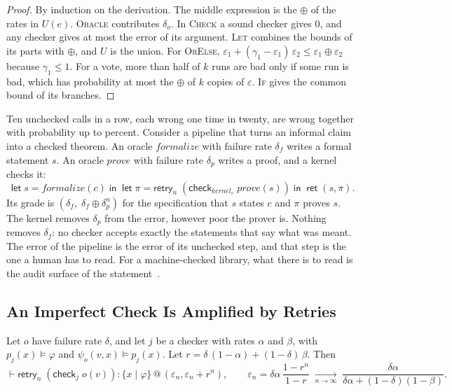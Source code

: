 \documentclass[acmsmall,nonacm,screen]{acmart}
\makeatletter
\newcommand{\kw}[1]{\mathsf{#1}}
\newcommand{\ret}{\kw{ret}}
\newcommand{\letin}[3]{\kw{let}\;#1 = #2\;\kw{in}\;#3}
\newcommand{\chk}[2]{\kw{check}_{#1}\;#2}
\newcommand{\retry}[2]{\kw{retry}_{#1}\;#2}
\newcommand{\rty}[2]{\{#1 \mid #2\}}
\newcommand{\at}[2]{\mathrel{@}(#1, #2)}
\newcommand{\nm}[1]{\mathit{#1}}
\makeatother
\begin{document}
\begin{proof}
By induction on the derivation. The middle expression is the $\oplus$ of the rates in
$U(e)$. \textsc{Oracle} contributes $\delta_o$. In \textsc{Check} a sound checker gives $0$,
and any checker gives at most the error of its argument. \textsc{Let} combines the bounds of its parts with
$\oplus$, and $U$ is the union. For \textsc{OrElse},
$\varepsilon_1 + (\gamma_1 - \varepsilon_1)\,\varepsilon_2 \le \varepsilon_1 \oplus
\varepsilon_2$ because $\gamma_1 \le 1$. For a vote, more than half of $k$ runs are bad only
if some run is bad, which has probability at most the $\oplus$ of $k$ copies of
$\varepsilon$. \textsc{If} gives the common bound of its branches.
\end{proof}

Ten unchecked calls in a row, each wrong one time in twenty, are wrong together with
probability up to \exChainTen{} percent. Consider a pipeline that turns an informal claim
into a checked theorem. An oracle $\nm{formalize}$ with failure rate $\delta_f$ writes a
formal statement $s$. An oracle $\nm{prove}$ with failure rate $\delta_p$ writes a proof, and
a kernel checks it:
\[
\letin{s}{\nm{formalize}(c)}{\;\letin{\pi}{\retry{n}{(\chk{\nm{kernel}_s}{\nm{prove}(s)})}}
  {\;\ret\;(s, \pi)}} .
\]
Its grade is $(\delta_f,\; \delta_f \oplus \delta_p^n)$ for the specification that $s$ states
$c$ and $\pi$ proves $s$. The kernel removes $\delta_p$ from the error, however poor the
prover is. Nothing removes $\delta_f$: no checker accepts exactly the statements that say
what was meant. The error of the pipeline is the error of its unchecked step, and that step
is the one a human has to read. For a machine-checked library, what there is to read is the
audit surface of the statement~\citep{tpp1}.

\subsection{An Imperfect Check Is Amplified by Retries}
\label{sec:imperfect}

\begin{corollary}
\label{cor:imperfect}
Let $o$ have failure rate $\delta$, and let $j$ be a checker with rates $\alpha$ and $\beta$,
with $p_j(x) \models \varphi$ and $\psi_o(v, x) \models p_j(x)$. Let
$r = \delta\,(1 - \alpha) + (1 - \delta)\,\beta$. Then
\[
\vdash \retry{n}{(\chk{j}{o(v)})} : \rty{x}{\varphi} \at{\varepsilon_n}{\varepsilon_n + r^n},
\qquad
\varepsilon_n = \delta\alpha\,\frac{1 - r^n}{1 - r}
\;\xrightarrow[n \to \infty]{}\; \frac{\delta\alpha}{\delta\alpha + (1 - \delta)(1 - \beta)} .
\]
\end{corollary}
\end{document}
